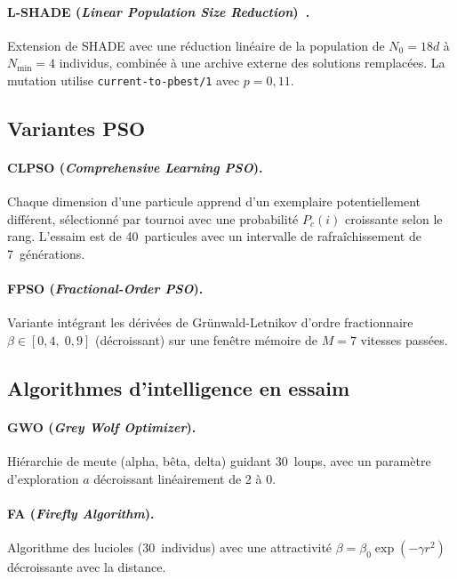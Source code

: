 \paragraph{L-SHADE (\textit{Linear Population Size Reduction})~\cite{tanabe2014}.}
Extension de SHADE avec une réduction linéaire de la population de $N_0 = 18d$
à $N_{\min} = 4$ individus, combinée à une archive externe des solutions
remplacées.  La mutation utilise \texttt{current-to-pbest/1} avec $p = 0{,}11$.

\subsection{Variantes PSO}

\paragraph{CLPSO (\textit{Comprehensive Learning PSO}).}
Chaque dimension d'une particule apprend d'un exemplaire potentiellement
différent, sélectionné par tournoi avec une probabilité $P_c(i)$ croissante
selon le rang.  L'essaim est de 40~particules avec un intervalle de
rafraîchissement de 7~générations.

\paragraph{FPSO (\textit{Fractional-Order PSO}).}
Variante intégrant les dérivées de Grünwald-Letnikov d'ordre fractionnaire
$\beta \in [0{,}4, \; 0{,}9]$ (décroissant) sur une fenêtre mémoire de $M = 7$
vitesses passées.

\subsection{Algorithmes d'intelligence en essaim}

\paragraph{GWO (\textit{Grey Wolf Optimizer}).}
Hiérarchie de meute (alpha, bêta, delta) guidant 30~loups, avec un paramètre
d'exploration $a$ décroissant linéairement de 2 à 0.

\paragraph{FA (\textit{Firefly Algorithm}).}
Algorithme des lucioles (30~individus) avec une attractivité $\beta =
\beta_0 \exp(-\gamma r^2)$ décroissante avec la distance.


